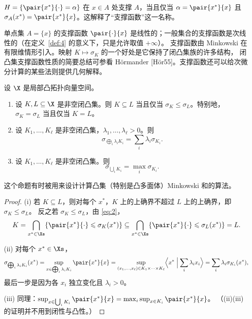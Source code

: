 \begin{remark}
\label{rem:2}
$H=\{\pair{x^*}{\cdot}=\alpha\}$ 在 $x\in A$ 处支撑 $A$，当且仅当 $\alpha=\pair{x^*}{x}$ 且 $\sigma_A(x^*)=\pair{x^*}{x}$。这解释了“支撑函数”这一名称。
\end{remark}

单点集 $A=\{x\}$ 的支撑函数 $\pair{\cdot}{x}$ 是线性的；一般集合的支撑函数是次线性的（在定义~\ref{def:4} 的意义下，只是允许取值 $+\infty$）。
支撑函数由 Minkowski 在有限维情形引入。映射 $K\mapsto\sigma_K$ 的一个好处是它保持了闭凸集族的许多结构，
闭凸集支撑函数性质的简要总结可参看 Hörmander [Hör55]。支撑函数还可以给次微分计算的某些法则提供几何解释。

\begin{proposition}
\label{res:13}
设 $\X$ 是局部凸拓扑向量空间。
\begin{enumerate}[label=(\roman*)]
  \item 设 $K,L\subseteq\X$ 是非空闭凸集。则 $K\subseteq L$ 当且仅当 $\sigma_K\leqslant\sigma_L$。特别地，$\sigma_K=\sigma_L$ 当且仅当 $K=L$。
  \item 设 $K_1,\dots,K_\ell$ 是非空闭凸集，$\lambda_1,\dots,\lambda_\ell>0$。则
  \[
    \sigma_{\bigoplus_i\lambda_iK_i}=\sum_i\lambda_i\sigma_{K_i}.
  \]
  \item 设 $K_1,\dots,K_\ell$ 是非空闭凸集。则
  \[
    \sigma_{\bigcup_iK_i}=\max_i\sigma_{K_i}.
  \]
\end{enumerate}
\end{proposition}

\begin{remark}
\label{rem:3}
这个命题有时被用来设计计算凸集（特别是凸多面体）Minkowski 和的算法。
\end{remark}

\begin{proof}
(i) 若 $K\subseteq L$，则对每个 $x^*$，$K$ 上的上确界不超过 $L$ 上的上确界，即 $\sigma_K\leqslant\sigma_L$。
反之若 $\sigma_K\leqslant\sigma_L$，由 \eqref{eq:2}，
\[
  K=\bigcap_{x^*\in\Xs}\{\pair{x^*}{\cdot}\leqslant\sigma_K(x^*)\}\subseteq\bigcap_{x^*\in\Xs}\{\pair{x^*}{\cdot}\leqslant\sigma_L(x^*)\}=L .
\]

(ii) 对每个 $x^*\in\Xs$，
\[
  \sigma_{\bigoplus_i\lambda_iK_i}(x^*)=\sup_{x\in\bigoplus_i\lambda_iK_i}\pair{x^*}{x}
  =\sup_{(x_1,\dots,x_\ell)\in K_1\times\dots\times K_\ell}\Bigl\langle x^*\Bigm|\sum_i\lambda_ix_i\Bigr\rangle
  =\sum_i\lambda_i\sigma_{K_i}(x^*),
\]
最后一步是因为各 $x_i$ 独立变化且 $\lambda_i>0$。

(iii) 同理：$\sup_{x\in\bigcup_iK_i}\pair{x^*}{x}=\max_i\sup_{x\in K_i}\pair{x^*}{x}$。
（(ii)(iii) 的证明并不用到闭性与凸性。）
\end{proof}

